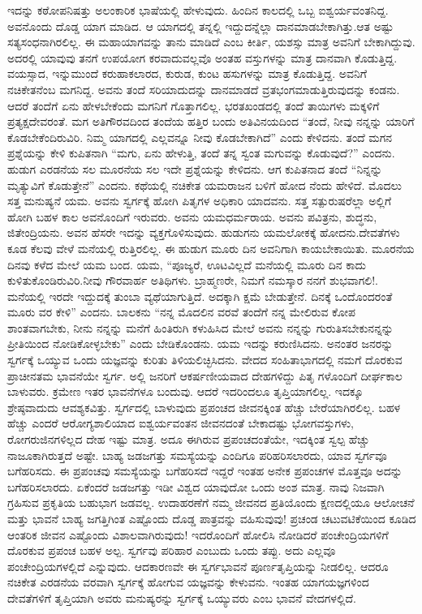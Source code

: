ಇದನ್ನು ಕಠೋಪನಿಷತ್ತು ಅಲಂಕಾರಿಕ ಭಾಷೆಯಲ್ಲಿ ಹೇಳುವುದು. ಹಿಂದಿನ ಕಾಲದಲ್ಲಿ ಒಬ್ಬ ಐಶ್ವರ್ಯವಂತನಿದ್ದ. ಅವನೊಂದು ದೊಡ್ಡ ಯಾಗ ಮಾಡಿದ. ಆ ಯಾಗದಲ್ಲಿ ತನ್ನಲ್ಲಿ ಇದ್ದುದನ್ನೆಲ್ಲಾ ದಾನಮಾಡಬೇಕಾಗಿತ್ತು.ಆತ ಅಷ್ಟು ಸತ್ಯಸಂಧನಾಗಿರಲಿಲ್ಲ. ಈ ಮಹಾಯಾಗವನ್ನು ತಾನು ಮಾಡಿದೆ ಎಂಬ ಕೀರ್ತಿ, ಯಶಸ್ಸು ಮಾತ್ರ ಅವನಿಗೆ ಬೇಕಾಗಿದ್ದುವು. ಅದರಲ್ಲಿ ಯಾವುವು ತನಗೆ ಉಪಯೋಗ ಕರವಾದುವಲ್ಲವೊ ಅಂತಹ ವಸ್ತುಗಳನ್ನು ಮಾತ್ರ ದಾನವಾಗಿ ಕೊಡುತ್ತಿದ್ದ. ವಯಸ್ಸಾದ, ಇನ್ನುಮುಂದೆ ಕರುಹಾಕಲಾರದ, ಕುರುಡ, ಕುಂಟ ಹಸುಗಳನ್ನು ಮಾತ್ರ ಕೊಡುತ್ತಿದ್ದ. ಅವನಿಗೆ ನಚಿಕೇತನೆಂಬ ಮಗನಿದ್ದ. ಅವನು ತಂದೆ ಸರಿಯಾದುದನ್ನು ದಾನಮಾಡದೆ ವ್ರತಭಂಗಮಾಡುತ್ತಿರುವುದನ್ನು ಕಂಡನು. ಆದರೆ ತಂದೆಗೆ ಏನು ಹೇಳಬೇಕೆಂದು ಮಗನಿಗೆ ಗೊತ್ತಾಗಲಿಲ್ಲ. ಭರತಖಂಡದಲ್ಲಿ ತಂದೆ ತಾಯಿಗಳು ಮಕ್ಕಳಿಗೆ ಪ್ರತ್ಯಕ್ಷದೇವರಂತೆ. ಮಗ ಅತಿಗೌರವದಿಂದ ತಂದೆಯ ಹತ್ತಿರ ಬಂದು ಅತಿವಿನಯದಿಂದ “ತಂದೆ, ನೀವು ನನ್ನನ್ನು ಯಾರಿಗೆ ಕೊಡಬೇಕೆಂದಿರುವಿರಿ. ನಿಮ್ಮ ಯಾಗದಲ್ಲಿ ಎಲ್ಲವನ್ನೂ ನೀವು ಕೊಡಬೇಕಾಗಿದೆ” ಎಂದು ಕೇಳಿದನು. ತಂದೆ ಮಗನ ಪ್ರಶ್ನೆಯನ್ನು ಕೇಳಿ ಕುಪಿತನಾಗಿ “ಮಗು, ಏನು ಹೇಳುತ್ತಿ, ತಂದೆ ತನ್ನ ಸ್ವಂತ ಮಗುವನ್ನು ಕೊಡುವುದೆ?” ಎಂದನು. ಹುಡುಗ ಎರಡನೆಯ ಸಲ ಮೂರನೆಯ ಸಲ ಇದೇ ಪ್ರಶ್ನೆಯನ್ನು ಕೇಳಿದನು. ಆಗ ಕುಪಿತನಾದ ತಂದೆ “ನಿನ್ನನ್ನು ಮೃತ್ಯುವಿಗೆ ಕೊಡುತ್ತೇನೆ” ಎಂದನು. ಕಥೆಯಲ್ಲಿ ನಚಿಕೇತ ಯಮರಾಜನ ಬಳಿಗೆ ಹೋದ ನೆಂದು ಹೇಳಿದೆ. ಮೊದಲು ಸತ್ತ ಮನುಷ್ಯನೆ ಯಮ. ಅವನು ಸ್ವರ್ಗಕ್ಕೆ ಹೋಗಿ ಪಿತೃಗಳ ಅಧಿಕಾರಿ ಯಾದವನು. ಸತ್ತ ಸತ್ಪುರುಷರೆಲ್ಲಾ ಅಲ್ಲಿಗೆ ಹೋಗಿ ಬಹಳ ಕಾಲ ಅವನೊಂದಿಗೆ ಇರುವರು. ಅವನು ಯಮಧರ್ಮರಾಯ. ಅವನು ಪವಿತ್ರನು, ಶುದ್ಧನು, ಜಿತೇಂದ್ರಿಯನು. ಅವನ ಹೆಸರೇ ಇದನ್ನು ವ್ಯಕ್ತಗೊಳಿಸುವುದು. ಹುಡುಗನು ಯಮಲೋಕಕ್ಕೆ ಹೋದನು.ದೇವತೆಗಳು ಕೂಡ ಕೆಲವು ವೇಳೆ ಮನೆಯಲ್ಲಿ ರುತ್ತಿರಲಿಲ್ಲ. ಈ ಹುಡುಗ ಮೂರು ದಿನ ಅವನಿಗಾಗಿ ಕಾಯಬೇಕಾಯಿತು. ಮೂರನೆಯ ದಿನವು ಕಳೆದ ಮೇಲೆ ಯಮ ಬಂದ. ಯಮ, “ಪೂಜ್ಯರೆ, ಊಟವಿಲ್ಲದೆ ಮನೆಯಲ್ಲಿ ಮೂರು ದಿನ ಕಾದು ಕುಳಿತುಕೊಂಡಿರುವಿರಿ.ನೀವು ಗೌರವಾರ್ಹ ಅತಿಥಿಗಳು. ಬ್ರಾಹ್ಮಣರೇ, ನಿಮಗೆ ನಮಸ್ಕಾರ ನನಗೆ ಶುಭವಾಗಲಿ!. ಮನೆಯಲ್ಲಿ ಇರದೇ ಇದ್ದುದಕ್ಕೆ ತುಂಬಾ ವ್ಯಥೆಯಾಗುತ್ತಿದೆ. ಅದಕ್ಕಾಗಿ ಕ್ಷಮೆ ಬೇಡುತ್ತೇನೆ. ದಿನಕ್ಕೆ ಒಂದೊಂದರಂತೆ ಮೂರು ವರ ಕೇಳಿ” ಎಂದನು. ಬಾಲಕನು “ನನ್ನ ಮೊದಲಿನ ವರವೆ ತಂದೆಗೆ ನನ್ನ ಮೇಲಿರುವ ಕೋಪ ಶಾಂತವಾಗಬೇಕು, ನೀನು ನನ್ನನ್ನು ಮನೆಗೆ ಹಿಂತಿರುಗಿ ಕಳುಹಿಸಿದ ಮೇಲೆ ಅವನು ನನ್ನನ್ನು ಗುರುತಿಸಬೇಕುನನ್ನನ್ನು ಪ್ರೀತಿಯಿಂದ ನೋಡಿಕೋಳ್ಳಬೇಕು” ಎಂದು ಬೇಡಿಕೊಂಡನು. ಯಮ ಇದನ್ನು ಕರುಣಿಸಿದನು. ಅನಂತರ ಜನರನ್ನು ಸ್ವರ್ಗಕ್ಕೆ ಒಯ್ಯುವ ಒಂದು ಯಜ್ಞವನ್ನು ಕುರಿತು ತಿಳಿಯಲಿಚ್ಛಿಸಿದನು. ವೇದದ ಸಂಹಿತಾಭಾಗದಲ್ಲಿ ನಮಗೆ ದೊರಕುವ ಪ್ರಾಚೀನತಮ ಭಾವನೆಯೇ ಸ್ವರ್ಗ. ಅಲ್ಲಿ ಜನರಿಗೆ ಆಕರ್ಷಣೀಯವಾದ ದೇಹಗಳಿದ್ದು ಪಿತೃ ಗಳೊಂದಿಗೆ ದೀರ್ಘಕಾಲ ಬಾಳುವರು. ಕ್ರಮೇಣ ಇತರ ಭಾವನೆಗಳೂ ಬಂದುವು. ಆದರೆ ಇದರಿಂದಲೂ ತೃಪ್ತಿಯಾಗಲಿಲ್ಲ. ಇದಕ್ಕೂ ಶ್ರೇಷ್ಠವಾದುದು ಆವಶ್ಯಕವಿತ್ತು. ಸ್ವರ್ಗದಲ್ಲಿ ಬಾಳುವುದು ಪ್ರಪಂಚದ ಜೀವನಕ್ಕಿಂತ ಹೆಚ್ಚು ಬೇರೆಯಾಗಿರಲಿಲ್ಲ. ಬಹಳ ಹೆಚ್ಚು ಎಂದರೆ ಆರೋಗ್ಯಶಾಲಿಯಾದ ಐಶ್ವರ್ಯವಂತನ ಜೀವನದಂತೆ ಬೇಕಾದಷ್ಟು ಭೋಗವಸ್ತುಗಳು, ರೋಗರುಜಿನಗಳಿಲ್ಲದ ದೇಹ ಇಷ್ಟು ಮಾತ್ರ. ಅದೂ ಈಗಿರುವ ಪ್ರಪಂಚದಂತೆಯೇ, ಇದಕ್ಕಿಂತ ಸ್ವಲ್ಪ ಹೆಚ್ಚು ನಾಜೂಕಾಗಿರುತ್ತದೆ ಅಷ್ಟೇ. ಬಾಹ್ಯ ಜಡಜಗತ್ತು ಸಮಸ್ಯೆಯನ್ನು ಎಂದಿಗೂ ಪರಿಹರಿಸಲಾರದು, ಯಾವ ಸ್ವರ್ಗವೂ ಬಗೆಹರಿಸದು. ಈ ಪ್ರಪಂಚವು ಸಮಸ್ಯೆಯನ್ನು ಬಗೆಹರಿಸದೆ ಇದ್ದರೆ ಇಂತಹ ಅನೇಕ ಪ್ರಪಂಚಗಳ ಮೊತ್ತವೂ ಅದನ್ನು ಬಗೆಹರಿಸಲಾರದು. ಏಕೆಂದರೆ ಜಡಜಗತ್ತು ಇಡೀ ವಿಶ್ವದ ಯಾವುದೋ ಒಂದು ಅಂಶ ಮಾತ್ರ. ನಾವು ನಿಜವಾಗಿ ಗ್ರಹಿಸುವ ಪ್ರಕೃತಿಯ ಬಹುಭಾಗ ಜಡವಲ್ಲ. ಉದಾಹರಣೆಗೆ ನಮ್ಮ ಜೀವನದ ಪ್ರತಿಯೊಂದು ಕ್ಷಣದಲ್ಲಿಯೂ ಆಲೋಚನೆ ಮತ್ತು ಭಾವನೆ ಬಾಹ್ಯ ಜಗತ್ತಿಗಿಂತ ಎಷ್ಟೊಂದು ದೊಡ್ಡ ಪಾತ್ರವನ್ನು ವಹಿಸುವುವು! ಪ್ರಚಂಡ ಚಟುವಟಿಕೆಯಿಂದ ಕೂಡಿದ ಆಂತರಿಕ ಜೀವನ ಎಷ್ಟೊಂದು ವಿಶಾಲವಾಗಿರುವುದು! ಇದರೊಂದಿಗೆ ಹೋಲಿಸಿ ನೋಡಿದರೆ ಪಂಚೇಂದ್ರಿಯಗಳಿಗೆ ದೊರಕುವ ಪ್ರಪಂಚ ಬಹಳ ಅಲ್ಪ. ಸ್ವರ್ಗವು ಪರಿಹಾರ ಎಂಬುದು ಒಂದು ತಪ್ಪು. ಅದು ಎಲ್ಲವೂ ಪಂಚೇಂದ್ರಿಯಗಳಲ್ಲಿದೆ ಎನ್ನುವುದು. ಆದಕಾರಣವೇ ಈ ಸ್ವರ್ಗಭಾವನೆ ಪೂರ್ಣತೃಪ್ತಿಯನ್ನು ನೀಡಲಿಲ್ಲ. ಆದರೂ ನಚಿಕೇತ ಎರಡನೆಯ ವರವಾಗಿ ಸ್ವರ್ಗಕ್ಕೆ ಹೋಗುವ ಯಜ್ಞವನ್ನು ಕೇಳುವನು. ಇಂತಹ ಯಾಗಯಜ್ಞಗಳಿಂದ ದೇವತೆಗಳಿಗೆ ತೃಪ್ತಿಯಾಗಿ ಅವರು ಮನುಷ್ಯರನ್ನು ಸ್ವರ್ಗಕ್ಕೆ ಒಯ್ಯುವರು ಎಂಬ ಭಾವನೆ ವೇದಗಳಲ್ಲಿದೆ.


